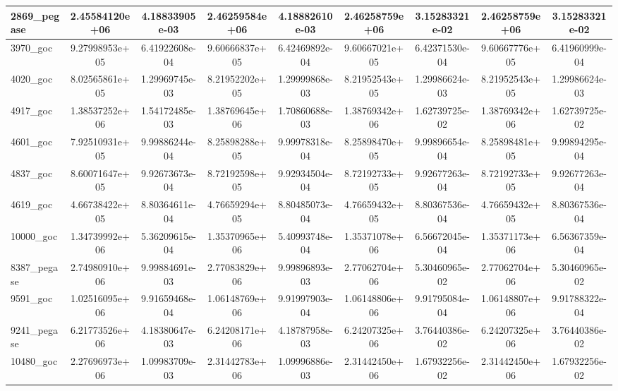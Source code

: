 \begin{tabular}{|l|cc|cc|cc|cc|}
2869\_pegase 
& 2.45584120e+06
& 4.18833905e-03
& 2.46259584e+06
& 4.18882610e-03
& 2.46258759e+06
& 3.15283321e-02
& 2.46258759e+06
& 3.15283321e-02
\\
\hline
3970\_goc 
& 9.27998953e+05
& 6.41922608e-04
& 9.60666837e+05
& 6.42469892e-04
& 9.60667021e+05
& 6.42371530e-04
& 9.60667776e+05
& 6.41960999e-04
\\

4020\_goc 
& 8.02565861e+05
& 1.29969745e-03
& 8.21952202e+05
& 1.29999868e-03
& 8.21952543e+05
& 1.29986624e-03
& 8.21952543e+05
& 1.29986624e-03
\\

4917\_goc 
& 1.38537252e+06
& 1.54172485e-03
& 1.38769645e+06
& 1.70860688e-03
& 1.38769342e+06
& 1.62739725e-02
& 1.38769342e+06
& 1.62739725e-02
\\

4601\_goc 
& 7.92510931e+05
& 9.99886244e-04
& 8.25898288e+05
& 9.99978318e-04
& 8.25898470e+05
& 9.99896654e-04
& 8.25898481e+05
& 9.99894295e-04
\\

4837\_goc 
& 8.60071647e+05
& 9.92673673e-04
& 8.72192598e+05
& 9.92934504e-04
& 8.72192733e+05
& 9.92677263e-04
& 8.72192733e+05
& 9.92677263e-04
\\
\hline
4619\_goc 
& 4.66738422e+05
& 8.80364611e-04
& 4.76659294e+05
& 8.80485073e-04
& 4.76659432e+05
& 8.80367536e-04
& 4.76659432e+05
& 8.80367536e-04
\\

10000\_goc 
& 1.34739992e+06
& 5.36209615e-04
& 1.35370965e+06
& 5.40993748e-04
& 1.35371078e+06
& 6.56672045e-04
& 1.35371173e+06
& 6.56367359e-04
\\

8387\_pegase 
& 2.74980910e+06
& 9.99884691e-03
& 2.77083829e+06
& 9.99896893e-03
& 2.77062704e+06
& 5.30460965e-02
& 2.77062704e+06
& 5.30460965e-02
\\

9591\_goc 
& 1.02516095e+06
& 9.91659468e-04
& 1.06148769e+06
& 9.91997903e-04
& 1.06148806e+06
& 9.91795084e-04
& 1.06148807e+06
& 9.91788322e-04
\\

9241\_pegase 
& 6.21773526e+06
& 4.18380647e-03
& 6.24208171e+06
& 4.18787958e-03
& 6.24207325e+06
& 3.76440386e-02
& 6.24207325e+06
& 3.76440386e-02
\\
\hline
10480\_goc 
& 2.27696973e+06
& 1.09983709e-03
& 2.31442783e+06
& 1.09996886e-03
& 2.31442450e+06
& 1.67932256e-02
& 2.31442450e+06
& 1.67932256e-02
\\


\end{tabular}
